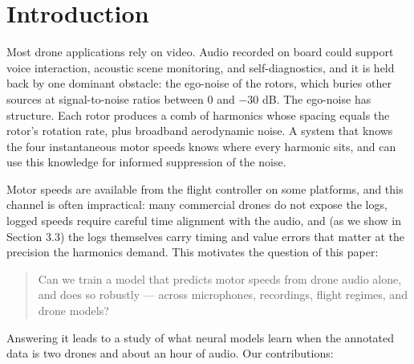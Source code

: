 \documentclass[journal]{IEEEtran}
\begin{document}
\begin{abstract}
range followed by phase-based refinement --- which beats the neural models
on cruise precision (0.7--1.0 rev/s against corrected telemetry) at orders
of magnitude higher inference cost. Finally, we evaluate synthetic training
data, from an analytic harmonic comb to a structure-constrained neural
noise generator: its realism does not transfer, and its measurable value
reduces to covering flight regimes the real corpus lacks. With the honest
real-data regime supplying that coverage directly, a synthetic pre-training
curriculum adds nothing for the best architecture (22.6 against 22.1),
retains a benefit only for the weakest one, and synthetic data mixed into
the real pool degrades every architecture regardless of the real recipe.
\end{abstract}

\section{Introduction}
\label{sec:intro}

Most drone applications rely on video. Audio recorded on board could support
voice interaction, acoustic scene monitoring, and self-diagnostics, and it is
held back by one dominant obstacle: the ego-noise of the rotors, which buries
other sources at signal-to-noise ratios between 0 and $-30$ dB. The ego-noise
has structure. Each rotor produces a comb of harmonics whose spacing equals
the rotor's rotation rate, plus broadband aerodynamic noise. A system that
knows the four instantaneous motor speeds knows where every harmonic sits,
and can use this knowledge for informed suppression of the noise.

Motor speeds are available from the flight controller on some platforms, and
this channel is often impractical: many commercial drones do not expose the
logs, logged speeds require careful time alignment with the audio, and (as we
show in Section 3.3) the logs themselves carry timing and value errors that
matter at the precision the harmonics demand. This motivates the question of
this paper:

\begin{quote}
Can we train a model that predicts motor speeds from drone audio alone, and
does so robustly --- across microphones, recordings, flight regimes, and
drone models?
\end{quote}

Answering it leads to a study of what neural models learn when the annotated
data is two drones and about an hour of audio. Our contributions:
\end{document}
